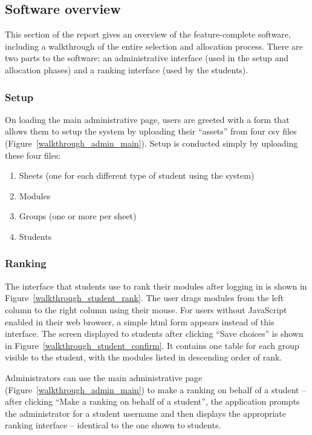 
\subsection{Software overview}
\label{developmentsoftwareoverview}

This section of the report gives an overview of the feature-complete software,
including a walkthrough of the entire selection and allocation process. There
are two parts to the software; an administrative interface (used in the setup
and allocation phases) and a ranking interface (used by the students).

\subsubsection{Setup}

On loading the main administrative page, users are greeted with a form that
allows them to setup the system by uploading their ``assets'' from four
\gls{csv} files (Figure~\ref{walkthrough_admin_main}). Setup is conducted
simply by uploading these four files:

\begin{enumerate}
  \item Sheets (one for each different type of student using the system)
  \item Modules
  \item Groups (one or more per sheet)
  \item Students
\end{enumerate}

\subsubsection{Ranking}

The interface that students use to rank their modules after logging in is
shown in Figure~\ref{walkthrough_student_rank}. The user drags modules from
the left column to the right column using their mouse. For users without
JavaScript enabled in their web browser, a simple \gls{html} form appears
instead of this interface. The screen displayed to students after clicking
``Save choices'' is shown in Figure~\ref{walkthrough_student_confirm}. It
contains one table for each group visible to the student, with the modules
listed in descending order of rank.

Administrators can use the main administrative page
(Figure~\ref{walkthrough_admin_main}) to make a ranking on behalf of a student
-- after clicking ``Make a ranking on behalf of a student'', the application
prompts the administrator for a student username and then displays the
appropriate ranking interface -- identical to the one shown to students.

